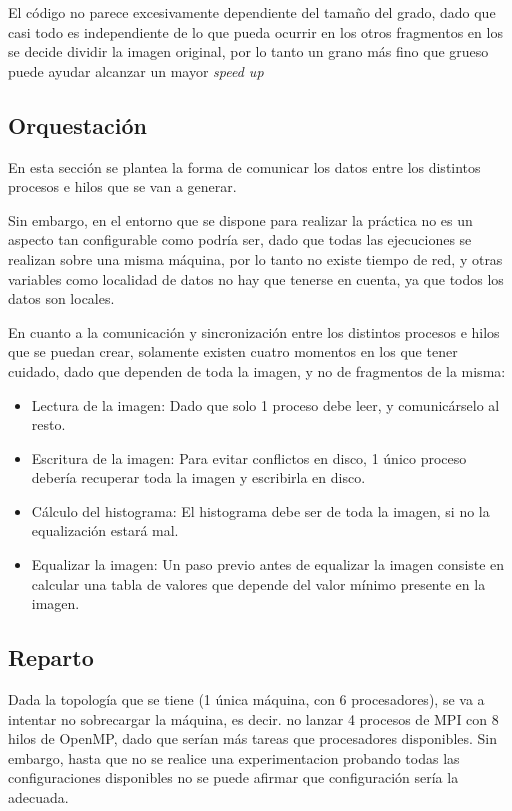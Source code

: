 \documentclass[12pt]{report} %
\begin{document}
El código no parece excesivamente dependiente del tamaño del grado, dado que casi todo es independiente de
lo que pueda ocurrir en los otros fragmentos en los se decide dividir la imagen original, por lo tanto un
grano más fino que grueso puede ayudar alcanzar un mayor \textit{speed up}

\subsection{Orquestación}

En esta sección se plantea la forma de comunicar los datos entre los distintos procesos e hilos que se van a generar.

Sin embargo, en el entorno que se dispone para realizar la práctica no es un aspecto tan configurable como podría ser,
dado que todas las ejecuciones se realizan sobre una misma máquina, por lo tanto no existe tiempo de red, y otras
variables como localidad de datos no hay que tenerse en cuenta, ya que todos los datos son locales.

En cuanto a la comunicación y sincronización entre los distintos procesos e hilos que se puedan crear, solamente existen
cuatro momentos en los que tener cuidado, dado que dependen de toda la imagen, y no de fragmentos de la misma:

\begin{itemize}
  \item Lectura de la imagen: Dado que solo 1 proceso debe leer, y comunicárselo al resto.
  \item Escritura de la imagen: Para evitar conflictos en disco, 1 único proceso debería recuperar toda la imagen y
      escribirla en disco.
  \item Cálculo del histograma: El histograma debe ser de toda la imagen, si no la equalización estará mal.
  \item Equalizar la imagen: Un paso previo antes de equalizar la imagen consiste en calcular una tabla de valores
      que depende del valor mínimo presente en la imagen.
\end{itemize}


\subsection{Reparto}

Dada la topología que se tiene (1 única máquina, con 6 procesadores), se va a intentar no sobrecargar la máquina,
es decir. no lanzar 4 procesos de MPI con 8 hilos de OpenMP, dado que serían más tareas que procesadores
disponibles. Sin embargo, hasta que no se realice una experimentacion probando todas las configuraciones
disponibles no se puede afirmar que configuración sería la adecuada.
\end{document}

